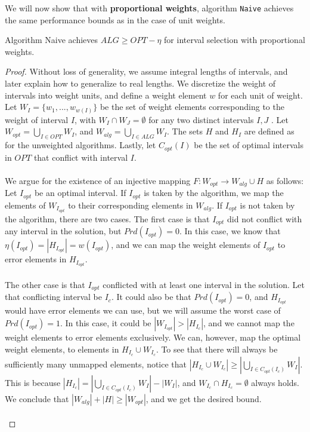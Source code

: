 We will now show that with \textbf{proportional weights}, algorithm \texttt{Naive} achieves the same performance bounds as in the case of unit weights.

\begin{theorem}
Algorithm Naive achieves $ALG \geq OPT - \eta$ for interval selection with proportional weights.
    \label{theo:prop-naive-pos}
\end{theorem}
\begin{proof}
        Without loss of generality, we assume integral lengths of intervals, and later explain how to generalize to real lengths. We discretize the weight of intervals into weight units, and define a weight element $w$ for each unit of weight. Let $W_{I} = \{w_{1},...,w_{w(I)}\}$ be the set of weight elements corresponding to the weight of interval $I$, with $W_{I} \cap W_{J} = \emptyset$ for any two distinct intervals $I,J$ . Let $W_{opt} = \bigcup_{I\in OPT}W_{I}$, and $W_{alg} = \bigcup_{I\in ALG}W_{I}$. The sets $H$ and $H_{I}$ are defined as for the unweighted algorithms. Lastly, let $C_{opt}(I)$ be the set of optimal intervals in $OPT$ that conflict with interval $I$.\\\\
    We argue for the existence of an injective mapping $F: W_{opt} \rightarrow W_{alg} \cup H$ as follows: Let $I_{opt}$ be an optimal interval. If $I_{opt}$ is taken by the algorithm, we map the elements of $W_{I_{opt}}$ to their corresponding elements in $W_{alg}$. If $I_{opt}$ is not taken by the algorithm, there are two cases. The first case is that $I_{opt}$ did not conflict with any interval in the solution, but $Prd(I_{opt}) = 0$. In this case, we know that $\eta(I_{opt}) = |H_{I_{opt}}| = w(I_{opt})$, and we can map the weight elements of $I_{opt}$ to error elements in $H_{I_{opt}}$.\\\\
    The other case is that $I_{opt}$ conflicted with at least one interval in the solution. Let that conflicting interval be $I_{c}$. It could also be that $Prd(I_{opt}) = 0$, and $H_{I_{opt}}$ would have error elements we can use, but we will assume the worst case of $Prd(I_{opt}) = 1$. In this case, it could be  $|W_{I_{opt}}| >  |H_{I_{c}}|$, and we cannot map the weight elements to error elements exclusively. We can, however, map the optimal weight elements, to elements in $H_{I_{c}} \cup W_{I_{c}}$. To see that there will always be sufficiently many unmapped elements, notice that $|H_{I_{c}} \cup W_{I_{c}}| \geq |\bigcup_{I \in C_{opt}(I_{c})}W_{I}|$. This is because $|H_{I_{c}}| = |\bigcup_{I \in C_{opt}(I_{c})}W_{I}| - |W_I|$, and $W_{I_c} \cap H_{I_c} = \emptyset$ always holds. We conclude that $|W_{alg}| + |H| \geq |W_{opt}|$, and we get the desired bound.\\\\

\end{proof}
